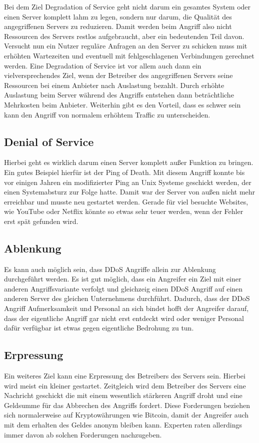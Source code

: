 Bei dem Ziel Degradation of Service geht nicht darum ein gesamtes System oder einen Server komplett lahm zu legen, sondern nur darum, die Qualität des angegriffenen Servers zu reduzieren. Damit werden beim Angriff also nicht Ressourcen des Servers restlos aufgebraucht, aber ein bedeutenden Teil davon. Versucht nun ein Nutzer reguläre Anfragen an den Server zu schicken muss mit erhöhten Wartezeiten und eventuell mit fehlgeschlagenen Verbindungen gerechnet werden. Eine Degradation of Service ist vor allem auch dann ein vielversprechendes Ziel, wenn der Betreiber des angegriffenen Servers seine Ressourcen bei einem Anbieter nach Auslastung bezahlt. Durch erhöhte Auslastung beim Server während des Angriffs entstehen dann beträchtliche Mehrkosten beim Anbieter. Weiterhin gibt es den Vorteil, dass es schwer sein kann den Angriff von normalem erhöhtem Traffic zu unterscheiden.

\subsection{Denial of Service}

Hierbei geht es wirklich darum einen Server komplett außer Funktion zu bringen. Ein gutes Beispiel hierfür ist der Ping of Death. Mit diesem Angriff konnte bis vor einigen Jahren ein modifizierter Ping an Unix Systeme geschickt werden, der einen Systemabsturz zur Folge hatte. Damit war der Server von außen nicht mehr erreichbar und musste neu gestartet werden. Gerade für viel besuchte Websites, wie YouTube oder Netflix könnte so etwas sehr teuer werden, wenn der Fehler erst spät gefunden wird.

\subsection{Ablenkung}

Es kann auch möglich sein, dass DDoS Angriffe allein zur Ablenkung durchgeführt werden. Es ist gut möglich, dass ein Angreifer ein Ziel mit einer anderen Angriffsvariante verfolgt und gleichzeig einen DDoS Angriff auf einen anderen Server des gleichen Unternehmens durchführt. Dadurch, dass der DDoS Angriff Aufmerksamkeit und Personal an sich bindet hofft der Angreifer darauf, dass der eigentliche Angriff gar nicht erst entdeckt wird oder  weniger Personal dafür verfügbar ist etwas gegen eigentliche Bedrohung zu tun.

\subsection{Erpressung}

Ein weiteres Ziel kann eine Erpressung des Betreibers des Servers sein. Hierbei wird meist ein kleiner gestartet. Zeitgleich wird dem Betreiber des Servers eine Nachricht geschickt die mit einem wesentlich stärkeren Angriff droht und eine Geldsumme für das Abbrechen des Angriffs fordert. Diese Forderungen beziehen sich normalerweise auf Kryptowährungen wie Bitcoin, damit der Angreifer auch mit dem erhalten des Geldes anonym bleiben kann. Experten raten allerdings immer davon ab solchen Forderungen nachzugeben.
